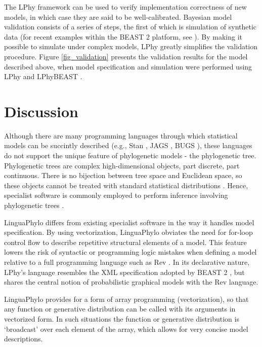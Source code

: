 \documentclass[10pt,letterpaper,table]{article}
\theoremstyle{definition}
\begin{document}
\noindent The LPhy framework can be used to verify implementation correctness of new models, in which case they are said to be well-calibrated.
Bayesian model validation consists of a series of steps, the first of which is simulation of synthetic data (for recent examples within the BEAST 2 platform, see \cite{gaboriau20,chen2022accounting}). 
By making it possible to simulate under complex models, LPhy greatly simplifies the validation procedure.
Figure \ref{fig_validation} presents the validation results for the model described above, when model specification and simulation were performed using LPhy and LPhyBEAST \cite{chen2022accounting}.

\section*{Discussion}
Although there are many
programming languages through which statistical 
models can be succintly described (e.g., Stan
\cite{carpenter2017stan}, JAGS \cite{plummer2003jags}, BUGS
\cite{lunn2009bugs, gilks1994language}), these languages do not
support the unique feature of phylogenetic models - the phylogenetic
tree.
Phylogenetic trees are complex high-dimensional objects, part
discrete, part continuous.
There is no bijection between tree space and Euclidean space, so these
objects cannot be treated with standard statistical distributions \cite{gavryushkin2016space}.
Hence, specialist software is commonly employed to perform inference
involving phylogenetic trees
\cite{hohna2016revbayes,bouckaert2019beastanalysis}.

LinguaPhylo differs from existing specialist software in the way it handles model specification.
By using vectorization, LinguaPhylo obviates the need for for-loop control flow to describe repetitive structural elements of a model.
This feature lowers the risk of syntactic or programming logic mistakes when defining a model relative to a full programming language such as Rev \cite{revbayes}.
In its declarative nature, LPhy's language resembles the XML specification adopted by BEAST 2 \cite{bouckaert2014beast}, but shares the central notion of probabilistic graphical models with the Rev language.

LinguaPhylo provides for a form of array programming (vectorization), so that any function or
generative distribution can be called with its arguments in
vectorized form. In such situations the function or generative distribution is `broadcast' over each element of the array, which allows for very concise model descriptions.
\end{document}
